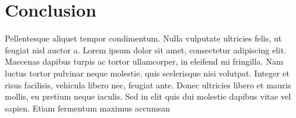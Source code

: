 
\section{Conclusion}
\label{sec:problem_formulation_conclusion}

Pellentesque aliquet tempor condimentum. Nulla vulputate ultricies felis, ut feugiat nisl auctor a. Lorem ipsum dolor sit amet, consectetur adipiscing elit. Maecenas dapibus turpis ac tortor ullamcorper, in eleifend mi fringilla. Nam luctus tortor pulvinar neque molestie, quis scelerisque nisi volutpat. Integer et risus facilisis, vehicula libero nec, feugiat ante. Donec ultricies libero et mauris mollis, eu pretium neque iaculis. Sed in elit quis dui molestie dapibus vitae vel sapien. Etiam fermentum maximus accumsan

